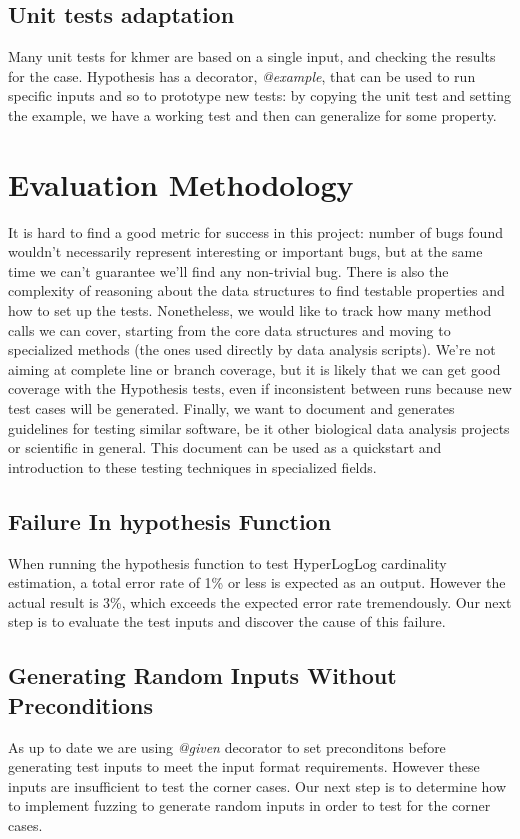 \documentclass[preprint,nocopyrightspace]{sig-alternate}
\begin{document}
\subsection{Unit tests adaptation}
Many unit tests for khmer are based on a single input,
and checking the results for the case.
Hypothesis has a decorator,
\emph{@example},
that can be used to run specific inputs and so to prototype new tests:
by copying the unit test and setting the example,
we have a working test and then can generalize for some property.

\section{Evaluation Methodology}
It is hard to find a good metric for success in this project:
number of bugs found wouldn't necessarily represent interesting or important bugs,
but at the same time we can't guarantee we'll find any non-trivial bug.
There is also the complexity of reasoning about the data structures to find testable properties and how to set up the tests.
Nonetheless,
we would like to track how many method calls we can cover,
starting from the core data structures and moving to specialized methods (the ones used directly by data analysis scripts).
We're not aiming at complete line or branch coverage,
but it is likely that we can get good coverage with the Hypothesis tests,
even if inconsistent between runs because new test cases will be generated.
Finally,
we want to document and generates guidelines for testing similar software,
be it other biological data analysis projects or scientific in general.
This document can be used as a quickstart and introduction to these testing techniques in specialized fields.

\subsection{Failure In hypothesis Function}
When running the hypothesis function to test HyperLogLog cardinality estimation, 
a total error rate of 1\% or less is expected as an output. 
However the actual result is 3\%, 
which exceeds the expected error rate tremendously. 
Our next step is to evaluate the test inputs and discover the cause of this failure.

\subsection{Generating Random Inputs Without Preconditions}
As up to date we are using \emph{@given} decorator to set preconditons before generating test inputs to meet the input format requirements. 
However these inputs are insufficient to test the corner cases. 
Our next step is to determine how to implement fuzzing to generate random inputs in order to test for the corner cases.
\end{document}
